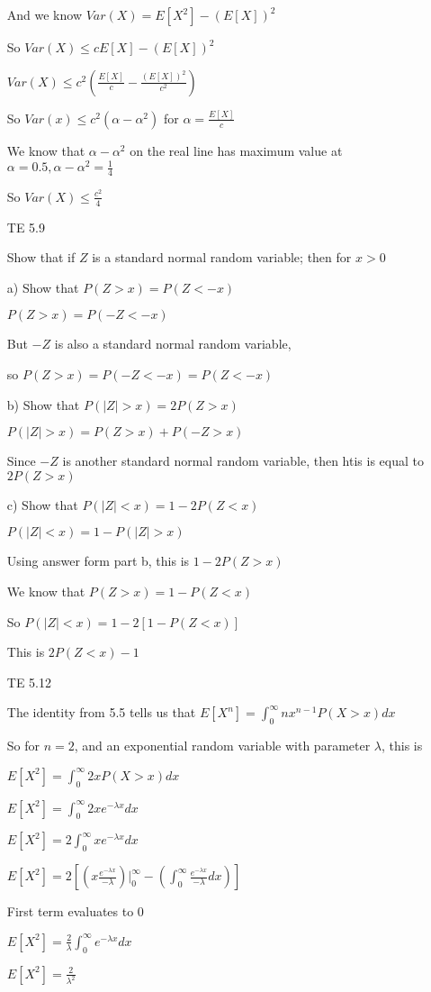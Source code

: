\documentclass[11pt]{article}
\begin{document}
\begin{itemize}
And we know $Var(X) = E[X^2] - (E[X])^2$

So $Var(X) \leq cE[X] - (E[X])^2$

$Var(X) \leq c^2(\frac{E[X]}{c} - \frac{(E[X])^2}{c^2})$

So $Var(x) \leq c^2(\alpha -\alpha^2)$ for $\alpha = \frac{E[X]}{c}$

We know that $\alpha - \alpha^2$ on the real line has maximum value at $\alpha = 0.5, \alpha - \alpha^2 = \frac{1}{4}$

So $Var(X) \leq \frac{c^2}{4}$

\item[TE 5.9]

Show that if $Z$ is a standard normal random variable; then for $x > 0$

a) Show that $P(Z > x) = P(Z < -x)$

$P(Z > x) = P(-Z < -x)$

But $-Z$ is also a standard normal random variable, 

so $P(Z > x) = P(-Z < -x ) = P(Z < -x)$

b) Show that $P(|Z| > x) = 2P(Z > x)$

$P(|Z| > x) = P(Z>x) + P(-Z > x)$

Since $-Z$ is another standard normal random variable, then htis is equal to $2P(Z > x)$

c) Show that $P(|Z| < x) = 1 - 2P(Z < x)$

$P(|Z| < x) = 1 - P(|Z| > x)$

Using answer form part b, this is $1 - 2P(Z > x)$

We know that $P(Z > x) = 1 - P(Z < x)$

So $P(|Z| < x) = 1 - 2[1-P(Z<x)]$

This is $2P(Z < x) - 1$

\item[TE 5.12]

The identity from 5.5 tells us that $E[X^n] = \int_{0}^{\infty} nx^{n-1} P(X > x) dx$

So for $n = 2$, and an exponential random variable with parameter $\lambda$, this is

$E[X^2] = \int_{0}^{\infty} 2x P(X > x) dx$

$E[X^2] = \int_{0}^{\infty} 2x e^{-\lambda x} dx$

$E[X^2] = 2\int_{0}^{\infty} x e^{-\lambda x} dx$

$E[X^2] = 2[(x\frac{e^{-\lambda x}}{-\lambda}) |_0^{\infty} - (\int_0^{\infty} \frac{e^{-\lambda x}}{-\lambda} dx)]$

First term evaluates to 0 

$E[X^2] = \frac{2}{\lambda} \int_0^{\infty} e^{-\lambda x} dx$

$E[X^2] = \frac{2}{\lambda ^2}$


\end{itemize}
\end{document}
